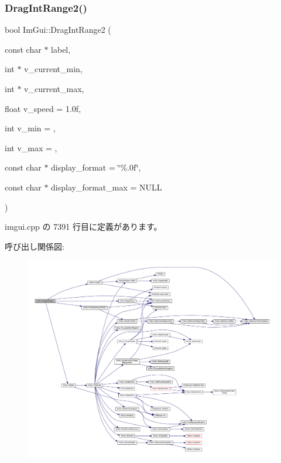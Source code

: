 \subsubsection{\texorpdfstring{Drag\+Int\+Range2()}{DragIntRange2()}}
{\footnotesize\ttfamily bool Im\+Gui\+::\+Drag\+Int\+Range2 (\begin{DoxyParamCaption}\item[{const char $\ast$}]{label,  }\item[{int $\ast$}]{v\+\_\+current\+\_\+min,  }\item[{int $\ast$}]{v\+\_\+current\+\_\+max,  }\item[{float}]{v\+\_\+speed = {\ttfamily 1.0f},  }\item[{int}]{v\+\_\+min = {},  }\item[{int}]{v\+\_\+max = {},  }\item[{const char $\ast$}]{display\+\_\+format = {\ttfamily \char`\"{}\%.0f\char`\"{}},  }\item[{const char $\ast$}]{display\+\_\+format\+\_\+max = {\ttfamily NULL} }\end{DoxyParamCaption})}



 imgui.\+cpp の 7391 行目に定義があります。

呼び出し関係図\+:\nopagebreak
\begin{figure}[H]
\begin{center}
\leavevmode
\includegraphics[width=350pt]{namespace_im_gui_a6aaacf92126bf45ce0e58348b5297a43_cgraph}
\end{center}
\end{figure}
\mbox{\label{namespace_im_gui_a8b0fb07113251301ff897b8578a53f34}} 
